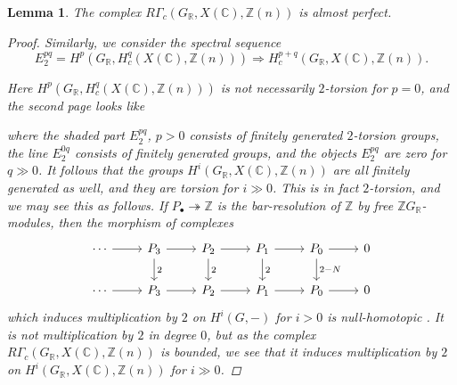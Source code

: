 \documentclass{article}
\newcommand{\CC}{\mathbb{C}}
\newcommand{\RR}{\mathbb{R}}
\newcommand{\ZZ}{\mathbb{Z}}
\newtheorem{lemma}[theorem]{Lemma}
\theoremstyle{definition}
\numberwithin{equation}{section}
\begin{document}
\begin{lemma}
  \label{lemma:RGammac(GR,X(C),Z(n))-almost-perfect}
  The complex $R\Gamma_c (G_\RR, X (\CC), \ZZ (n))$
  is almost perfect.

  \begin{proof}
    Similarly, we consider the spectral sequence
    \[ E_2^{pq} = H^p (G_\RR, H^q_c (X (\CC), \ZZ (n)))
    \Longrightarrow
    H^{p+q}_c (G_\RR, X (\CC), \ZZ (n)). \]

    Here $H^p (G_\RR, H^q_c (X (\CC), \ZZ (n)))$ is not necessarily $2$-torsion
    for $p = 0$, and the second page looks like
    \begin{center}
    \end{center}
    where the shaded part $E_2^{pq}$, $p > 0$ consists of finitely generated
    $2$-torsion groups, the line $E_2^{0q}$ consists of finitely generated
    groups, and the objects $E_2^{pq}$ are zero for $q \gg 0$. It follows that
    the groups $H^i (G_\RR, X (\CC), \ZZ (n))$ are all finitely generated as
    well, and they are torsion for $i \gg 0$. This is in fact $2$-torsion, and
    we may see this as follows. If $P_\bullet \twoheadrightarrow \ZZ$ is the
    bar-resolution of $\ZZ$ by free $\ZZ G_\RR$-modules, then the morphism of
    complexes
    \[ \begin{tikzcd}
      \cdots\ar{r} & P_3\ar{r}\ar{d}{2} & P_2\ar{r}\ar{d}{2} & P_1\ar{r}\ar{d}{2} & P_0\ar{r}\ar{d}{2-N} & 0 \\
      \cdots\ar{r} & P_3\ar{r} & P_2\ar{r} & P_1\ar{r} & P_0\ar{r} & 0
    \end{tikzcd} \]
    which induces multiplication by $2$ on $H^i (G,-)$ for $i > 0$
    is null-homotopic \cite[Theorem 6.5.8]{Weibel-1994}. It is not
    multiplication by $2$ in degree $0$, but as the complex
    $R\Gamma_c (G_\RR, X (\CC), \ZZ (n))$ is bounded, we see that it induces
    multiplication by $2$ on $H^i (G_\RR, X (\CC), \ZZ (n))$ for $i \gg 0$.
  \end{proof}
\end{lemma}
\end{document}
